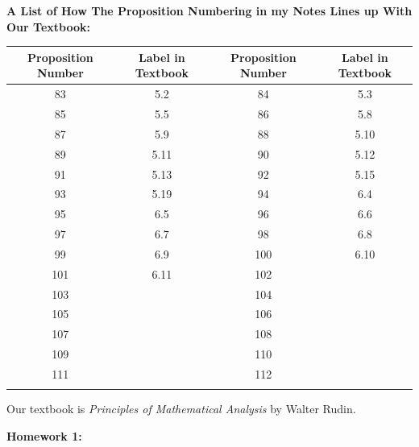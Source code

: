 \documentclass{book}
\newenvironment{allowTableDashes}{\ADLactivate}{\ADLinactivate}
\newcommand{\pracOne}{
   \color{BrickRed}%
   \fontsize{13}{15}\selectfont%
}
\newcommand{\exOne}{%
   \color{Purple}%
   \fontsize{14}{16}\selectfont%
}
\newcommand*{\markHW}[1]{%
   {\huge \color{Black} \textbf{#1} \newline}%
}
\newcommand{\retTwo}{\hfill\bigbreak}
\newcommand{\myVS}{\vphantom{$\int_a^b$}}
\begin{document}
\newpage
{\huge \color{Black} \textbf{A List of How The Proposition Numbering in my Notes Lines up With Our Textbook:} \retTwo}
\exOne

\begin{allowTableDashes}
   \begin{tabular}{ c|c||c|c }
      Proposition Number & Label in Textbook & Proposition Number & Label in Textbook \\ \hline
      
      \myVS 83 & 5.2 & 84 & 5.3 \\ \hdashline[10pt/3pt]
      \myVS 85 & 5.5 & 86 & 5.8 \\ \hdashline[10pt/3pt]
      \myVS 87 & 5.9  & 88 & 5.10 \\ \hdashline[10pt/3pt]
      \myVS 89 & 5.11 & 90 & 5.12 \\ \hdashline[10pt/3pt]
      \myVS 91 & 5.13 & 92 & 5.15 \\ \hdashline[10pt/3pt]
      \myVS 93 & 5.19 & 94 & 6.4  \\ \hdashline[10pt/3pt]
      \myVS 95 & 6.5 & 96 & 6.6 \\ \hdashline[10pt/3pt]
      \myVS 97 & 6.7 & 98 & 6.8 \\ \hdashline[10pt/3pt]
      \myVS 99 & 6.9 & 100 & 6.10 \\ \hdashline[10pt/3pt]
      \myVS 101 & 6.11 & 102 &  \\ \hdashline[10pt/3pt]
      \myVS 103 &  & 104 &  \\ \hdashline[10pt/3pt]
      \myVS 105 &  & 106 &  \\ \hdashline[10pt/3pt]
      \myVS 107 &  & 108 &  \\ \hdashline[10pt/3pt]
      \myVS 109 &  & 110 &  \\ \hdashline[10pt/3pt]
      \myVS 111 &  & 112 &  \\ \hdashline[10pt/3pt]
   \end{tabular}

\end{allowTableDashes}

\retTwo

Our textbook is \textit{Principles of Mathematical Analysis} by Walter Rudin.







\newpage
\pracOne

\markHW{Homework 1:}
\end{document}
